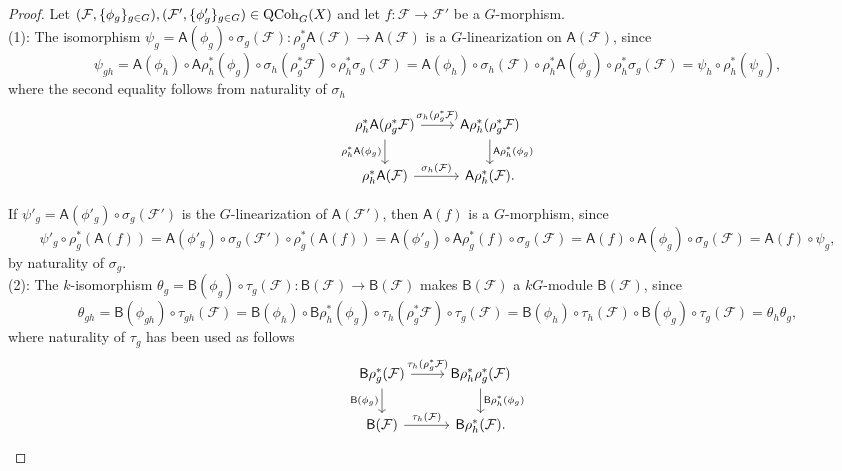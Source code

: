 \documentclass[10pt]{amsart}
\theoremstyle{definition}
\begin{document}
\begin{proof}
Let $(\mathcal{F},\{\phi_g\}_{g\in G}),(\mathcal{F'},\{\phi'_g\}_{g\in G})\in{\rm QCoh}_G(X)$ and let $f:\mathcal{F}\rightarrow\mathcal{F'}$ be a $G$-morphism.\\

(1): The isomorphism $\psi_g=\mathsf{A}(\phi_g)\circ\sigma_g(\mathcal{F}):\rho_g^* \mathsf{A}(\mathcal{F})\rightarrow \mathsf{A}(\mathcal{F})$ is a $G$-linearization on $\mathsf{A}(\mathcal{F})$, since
\[
\psi_{gh}
=\mathsf{A}(\phi_h)\circ \mathsf{A}\rho_h^*(\phi_g)\circ\sigma_h(\rho_g^*\mathcal{F})\circ\rho_h^*\sigma_g(\mathcal{F})
=\mathsf{A}(\phi_h)\circ \sigma_h(\mathcal{F})\circ \rho_h^*\mathsf{A}(\phi_g)\circ\rho_h^*\sigma_g(\mathcal{F})
=\psi_h\circ\rho^*_h(\psi_g),
\]
where the second equality follows from naturality of $\sigma_h$
\[
\begin{tikzcd}
\rho_h^*\mathsf{A}(\rho_g^*\mathcal{F}) \arrow[r,"\sigma_h(\rho_g^*\mathcal{F})"] \arrow[d,"\rho_h^*\mathsf{A}(\phi_g)"'] & \mathsf{A}\rho_h^*(\rho_g^*\mathcal F) \arrow[d,"\mathsf{A}\rho^*_h(\phi_g)"] \\
\rho_h^*\mathsf{A}(\mathcal F) \arrow[r,"\sigma_h(\mathcal{F})"] & \mathsf{A}\rho_h^*(\mathcal F).
\end{tikzcd}
\]

If $\psi'_g=\mathsf{A}(\phi'_g)\circ\sigma_g(\mathcal{F'})$ is the $G$-linearization of $\mathsf{A}(\mathcal{F'})$, then $\mathsf{A}(f)$ is a $G$-morphism, since
\[
\psi'_g\circ\rho^*_g(\mathsf{A}(f))=\mathsf{A}(\phi'_g)\circ\sigma_g(\mathcal{F'})\circ\rho^*_g(\mathsf{A}(f))=\mathsf{A}(\phi'_g)\circ \mathsf{A}\rho_g^*(f)\circ\sigma_g(\mathcal{F})=\mathsf{A}(f)\circ \mathsf{A}(\phi_g)\circ\sigma_g(\mathcal{F})=\mathsf{A}(f)\circ\psi_g,
\]
by naturality of $\sigma_g$.\\

(2): The $k$-isomorphism $\theta_g=\mathsf{B}(\phi_g)\circ\tau_g(\mathcal{F}):\mathsf{B}(\mathcal{F})\rightarrow \mathsf{B}(\mathcal{F})$ makes $\mathsf{B}(\mathcal{F})$ a $kG$-module $\mathsf{B}(\mathcal{F})$, since
\[
\theta_{gh}
=\mathsf{B}(\phi_{gh})\circ\tau_{gh}(\mathcal{F})
=\mathsf{B}(\phi_h)\circ \mathsf{B}\rho_h^*(\phi_g)\circ\tau_h(\rho_g^*\mathcal{F})\circ \tau_g(\mathcal{F})
=\mathsf{B}(\phi_h)\circ \tau_h(\mathcal{F})\circ \mathsf{B}(\phi_g)\circ\tau_g(\mathcal{F})
=\theta_h\theta_g,
\]
where naturality of $\tau_g$ has been used as follows
\[
\begin{tikzcd}
\mathsf{B}\rho_g^*(\mathcal{F}) \arrow[r,"\tau_h(\rho_g^*\mathcal{F})"] \arrow[d,"\mathsf{B}(\phi_g)"'] & \mathsf{B}\rho_h^*\rho_g^*(\mathcal F) \arrow[d,"\mathsf{B}\rho_h^*(\phi_g)"] \\
\mathsf{B}(\mathcal F) \arrow[r,"\tau_h(\mathcal{F})"] & \mathsf{B}\rho_h^*(\mathcal F).
\end{tikzcd}
\]


\end{proof}
\end{document}
